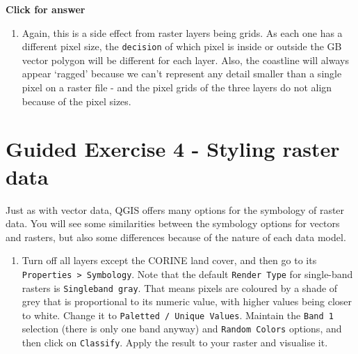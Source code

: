 \documentclass[
  letterpaper,
  DIV=11,
  numbers=noendperiod]{scrreprt}
\providecommand{\tightlist}{%
  \setlength{\itemsep}{0pt}\setlength{\parskip}{0pt}}\usepackage{longtable,booktabs,array}
\begin{document}
\begin{tcolorbox}[enhanced jigsaw, leftrule=.75mm, colframe=quarto-callout-important-color-frame, breakable, toprule=.15mm, bottomrule=.15mm, arc=.35mm, rightrule=.15mm, opacityback=0, colback=white, left=2mm]

\vspace{-3mm}\textbf{Click for answer}\vspace{3mm}

\begin{enumerate}
\def\labelenumi{\alph{enumi})}
\tightlist
\item
  Again, this is a side effect from raster layers being grids. As each
  one has a different pixel size, the \texttt{decision} of which pixel
  is inside or outside the GB vector polygon will be different for each
  layer. Also, the coastline will always appear `ragged' because we
  can't represent any detail smaller than a single pixel on a raster
  file - and the pixel grids of the three layers do not align because of
  the pixel sizes.
\end{enumerate}

\end{tcolorbox}

\section{Guided Exercise 4 - Styling raster
data}\label{guided-exercise-4---styling-raster-data}

Just as with vector data, QGIS offers many options for the symbology of
raster data. You will see some similarities between the symbology
options for vectors and rasters, but also some differences because of
the nature of each data model.

\begin{enumerate}
\def\labelenumi{(\arabic{enumi})}
\setcounter{enumi}{140}
\tightlist
\item
  Turn off all layers except the CORINE land cover, and then go to its
  \texttt{Properties\ \textgreater{}\ Symbology}. Note that the default
  \texttt{Render\ Type} for single-band rasters is
  \texttt{Singleband\ gray}. That means pixels are coloured by a shade
  of grey that is proportional to its numeric value, with higher values
  being closer to white. Change it to
  \texttt{Paletted\ /\ Unique\ Values}. Maintain the \texttt{Band\ 1}
  selection (there is only one band anyway) and \texttt{Random\ Colors}
  options, and then click on \texttt{Classify}. Apply the result to your
  raster and visualise it.
\end{enumerate}
\end{document}
